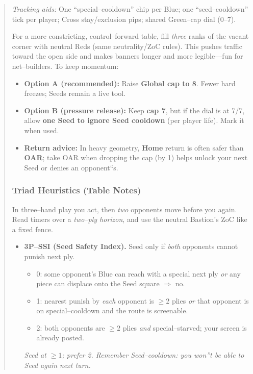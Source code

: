 \documentclass[11pt]{article}
\begin{document}
\begin{quote}
\medskip
\noindent\textit{Tracking aids:} One ``special--cooldown'' chip per Blue; one ``seed--cooldown'' tick per player; Cross stay/exclusion pips; shared Green--cap dial (0--7).

\begin{tcolorbox}[enhanced,breakable,title={Heavy Bastion (3--Rank Wall) --- Optional Adjustments},
  colback=royal!3,colframe=royal!70!black,boxrule=0.8pt]
\small
For a more constricting, control--forward table, fill \emph{three} ranks of the vacant corner with neutral Reds (same neutrality/ZoC rules). This pushes traffic toward the open side and makes banners longer and more legible---fun for net--builders. To keep momentum:

\begin{itemize}[leftmargin=1.3em,itemsep=0.2em]
  \item \textbf{Option A (recommended):} Raise \textbf{Global cap to 8}. Fewer hard freezes; Seeds remain a live tool.
  \item \textbf{Option B (pressure release):} Keep \textbf{cap 7}, but if the dial is at 7/7, allow \textbf{one Seed to ignore Seed cooldown} (per player life). Mark it when used.
  \item \textbf{Return advice:} In heavy geometry, \textbf{Home} return is often safer than \textbf{OAR}; take OAR when dropping the cap (by 1) helps unlock your next Seed or denies an opponent``s.
\end{itemize}
\end{tcolorbox}

\subsubsection*{Triad Heuristics (Table Notes)}
\label{sec:triad-heuristics}

\noindent In three--hand play you act, then \emph{two} opponents move before you again. Read timers  over a \emph{two--ply horizon}, and use the neutral Bastion's ZoC like a fixed fence.

\medskip
\begin{itemize}[leftmargin=1.3em,itemsep=0.35em]

  \item \textbf{3P--SSI (Seed Safety Index).} Seed only if \emph{both} opponents cannot punish next ply.
  \begin{itemize}[itemsep=0.2em]
    \item 0: some opponent's Blue can reach with a special next ply \emph{or} any piece can displace onto the Seed square $\Rightarrow$ no.
    \item 1: nearest punish by \emph{each} opponent is $\ge 2$ plies \emph{or} that opponent is on special--cooldown and the route is screenable.
    \item 2: both opponents are $\ge 2$ plies \emph{and} special--starved; your screen is already posted.
  \end{itemize}
  \emph{Seed at $\ge 1$; prefer 2. Remember Seed--cooldown: you won''t be able to Seed again next turn.}


\end{itemize}
\end{quote}
\end{document}
